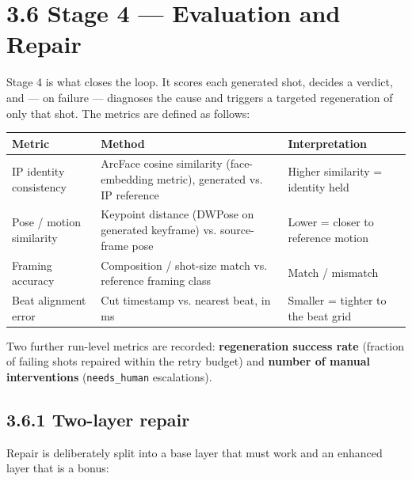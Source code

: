 \documentclass[10pt,twocolumn,letterpaper]{article}
\begin{document}

\section*{3.6 Stage 4 --- Evaluation and Repair}

Stage 4 is what closes the loop. It scores each generated shot, decides a verdict, and --- on failure --- diagnoses the cause and triggers a targeted regeneration of only that shot. The metrics are defined as follows:

\begin{table}[t]
\centering
\footnotesize
\begin{tabularx}{\textwidth}{>{\RaggedRight\arraybackslash}X>{\RaggedRight\arraybackslash}X>{\RaggedRight\arraybackslash}X}
\toprule
Metric & Method & Interpretation \\
\midrule
IP identity consistency & ArcFace cosine similarity (face-embedding metric), generated vs. IP reference & Higher similarity = identity held \\
Pose / motion similarity & Keypoint distance (DWPose on generated keyframe) vs. source-frame pose & Lower = closer to reference motion \\
Framing accuracy & Composition / shot-size match vs. reference framing class & Match / mismatch \\
Beat alignment error & Cut timestamp vs. nearest beat, in ms & Smaller = tighter to the beat grid \\
\bottomrule
\end{tabularx}
\end{table}

Two further run-level metrics are recorded: \textbf{regeneration success rate} (fraction of failing shots repaired within the retry budget) and \textbf{number of manual interventions} (\texttt{needs\_human} escalations).


\subsection*{3.6.1 Two-layer repair}

Repair is deliberately split into a base layer that must work and an enhanced layer that is a bonus:
\end{document}
